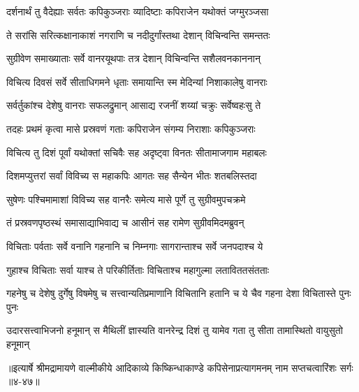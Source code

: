
\twolineshloka
{दर्शनार्थं तु वैदेह्याः सर्वतः कपिकुञ्जराः}
{व्यादिष्टाः कपिराजेन यथोक्तं जग्मुरञ्जसा} %

\twolineshloka
{ते सरांसि सरित्कक्षानाकाशं नगराणि च}
{नदीदुर्गांस्तथा देशान् विचिन्वन्ति समन्ततः} %

\twolineshloka
{सुग्रीवेण समाख्याताः सर्वे वानरयूथपाः}
{तत्र देशान् विचिन्वन्ति सशैलवनकाननान्} %

\twolineshloka
{विचित्य दिवसं सर्वे सीताधिगमने धृताः}
{समायान्ति स्म मेदिन्यां निशाकालेषु वानराः} %

\twolineshloka
{सर्वर्तुकांश्च देशेषु वानराः सफलद्रुमान्}
{आसाद्य रजनीं शय्यां चक्रुः सर्वेष्वहःसु ते} %

\twolineshloka
{तदहः प्रथमं कृत्वा मासे प्रस्रवणं गताः}
{कपिराजेन संगम्य निराशाः कपिकुञ्जराः} %

\twolineshloka
{विचित्य तु दिशं पूर्वां यथोक्तां सचिवैः सह}
{अदृष्ट्वा विनतः सीतामाजगाम महाबलः} %

\twolineshloka
{दिशमप्युत्तरां सर्वां विविच्य स महाकपिः}
{आगतः सह सैन्येन भीतः शतबलिस्तदा} %

\twolineshloka
{सुषेणः पश्चिमामाशां विविच्य सह वानरैः}
{समेत्य मासे पूर्णे तु सुग्रीवमुपचक्रमे} %

\twolineshloka
{तं प्रस्रवणपृष्ठस्थं समासाद्याभिवाद्य च}
{आसीनं सह रामेण सुग्रीवमिदमब्रुवन्} %

\twolineshloka
{विचिताः पर्वताः सर्वे वनानि गहनानि च}
{निम्नगाः सागरान्ताश्च सर्वे जनपदाश्च ये} %

\twolineshloka
{गुहाश्च विचिताः सर्वा याश्च ते परिकीर्तिताः}
{विचिताश्च महागुल्मा लताविततसंतताः} %

\threelineshloka
{गहनेषु च देशेषु दुर्गेषु विषमेषु च}
{सत्त्वान्यतिप्रमाणानि विचितानि हतानि च}
{ये चैव गहना देशा विचितास्ते पुनः पुनः} %

\twolineshloka
{उदारसत्त्वाभिजनो हनूमान् स मैथिलीं ज्ञास्यति वानरेन्द्र}
{दिशं तु यामेव गता तु सीता तामास्थितो वायुसुतो हनूमान्} %


॥इत्यार्षे श्रीमद्रामायणे वाल्मीकीये आदिकाव्ये किष्किन्धाकाण्डे कपिसेनाप्रत्यागमनम् नाम सप्तचत्वारिंशः सर्गः ॥४-४७॥
